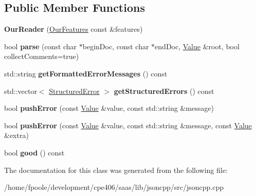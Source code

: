 \subsection*{Public Member Functions}
\begin{DoxyCompactItemize}
\item 
\hypertarget{class_json_1_1_our_reader_a48a850914b9c8d7781be172930c478e5}{}{\bfseries Our\+Reader} (\hyperlink{class_json_1_1_our_features}{Our\+Features} const \&features)\label{class_json_1_1_our_reader_a48a850914b9c8d7781be172930c478e5}

\item 
\hypertarget{class_json_1_1_our_reader_aba4f8749aab7f02ec17f107e392caf80}{}bool {\bfseries parse} (const char $\ast$begin\+Doc, const char $\ast$end\+Doc, \hyperlink{class_json_1_1_value}{Value} \&root, bool collect\+Comments=true)\label{class_json_1_1_our_reader_aba4f8749aab7f02ec17f107e392caf80}

\item 
\hypertarget{class_json_1_1_our_reader_ae9cbb7dbd9c6c96be37432e8dfa1afcb}{}std\+::string {\bfseries get\+Formatted\+Error\+Messages} () const \label{class_json_1_1_our_reader_ae9cbb7dbd9c6c96be37432e8dfa1afcb}

\item 
\hypertarget{class_json_1_1_our_reader_a02ef7871af3706754a233c36e6d489e9}{}std\+::vector$<$ \hyperlink{struct_json_1_1_our_reader_1_1_structured_error}{Structured\+Error} $>$ {\bfseries get\+Structured\+Errors} () const \label{class_json_1_1_our_reader_a02ef7871af3706754a233c36e6d489e9}

\item 
\hypertarget{class_json_1_1_our_reader_aef7aa4ca22ffaa38c401b16951d20e1e}{}bool {\bfseries push\+Error} (const \hyperlink{class_json_1_1_value}{Value} \&value, const std\+::string \&message)\label{class_json_1_1_our_reader_aef7aa4ca22ffaa38c401b16951d20e1e}

\item 
\hypertarget{class_json_1_1_our_reader_ad43315cbb0d6804e3b7177e84a1ec53d}{}bool {\bfseries push\+Error} (const \hyperlink{class_json_1_1_value}{Value} \&value, const std\+::string \&message, const \hyperlink{class_json_1_1_value}{Value} \&extra)\label{class_json_1_1_our_reader_ad43315cbb0d6804e3b7177e84a1ec53d}

\item 
\hypertarget{class_json_1_1_our_reader_a048346238d703ad9aed06beb686e6102}{}bool {\bfseries good} () const \label{class_json_1_1_our_reader_a048346238d703ad9aed06beb686e6102}

\end{DoxyCompactItemize}


The documentation for this class was generated from the following file\+:\begin{DoxyCompactItemize}
\item 
/home/fpoole/development/cpe406/saas/lib/jsoncpp/src/jsoncpp.\+cpp\end{DoxyCompactItemize}
